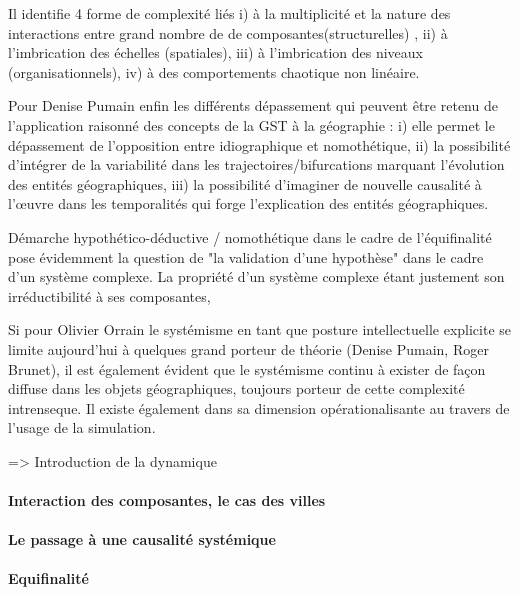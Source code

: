 {Il identifie 4 forme de complexité \autocite[45]{Dauphine2003} liés i) à la multiplicité et la nature des interactions entre grand nombre de de composantes(structurelles) , ii) à l'imbrication des échelles (spatiales), iii) à l'imbrication des niveaux (organisationnels), iv) à des comportements chaotique non linéaire. 

Pour Denise Pumain \autocite[]{Pumain1989} \autocite{Pumain2003} enfin les différents dépassement qui peuvent être retenu de l'application raisonné des concepts de la GST à la géographie : i) elle permet le dépassement de l'opposition entre idiographique et nomothétique, ii) la possibilité d'intégrer de la variabilité dans les trajectoires/bifurcations marquant l'évolution des entités géographiques, iii) la possibilité d'imaginer de nouvelle causalité à l’œuvre dans les temporalités qui forge l'explication des entités géographiques.

Démarche hypothético-déductive / nomothétique dans le cadre de l'équifinalité pose évidemment la question de "la validation d'une hypothèse" dans le cadre d'un système complexe. La propriété d'un système complexe étant justement son irréductibilité à ses composantes,

Si pour Olivier Orrain le systémisme en tant que posture intellectuelle explicite se limite aujourd'hui à quelques grand porteur de théorie  (Denise Pumain, Roger Brunet), il est également évident que le systémisme continu à exister de façon diffuse dans les objets géographiques, toujours porteur de cette complexité intrenseque. Il existe également dans sa dimension opérationalisante au travers de l'usage de la simulation.

=> Introduction de la dynamique 


\paragraph{Interaction des composantes, le cas des villes}

\paragraph{Le passage à une causalité systémique}

\paragraph{Equifinalité}

}
